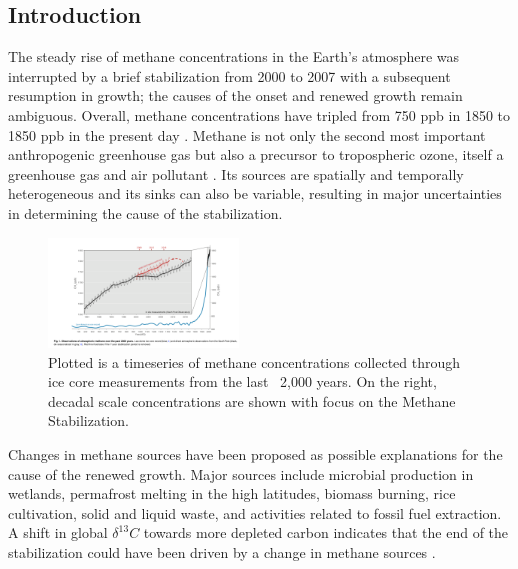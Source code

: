 \documentclass[two column,grl]{AGUTeX}
\begin{document}
\begin{article}

\section{Introduction}
The steady rise of methane concentrations in the Earth’s atmosphere was interrupted by a brief stabilization from 2000 to 2007 with  a subsequent resumption in growth; the causes of the onset and renewed growth remain ambiguous. Overall, methane concentrations have tripled  from 750 ppb in 1850 to 1850 ppb in the present day \citep{IPCC}. Methane is not only the second most important anthropogenic greenhouse gas  but also a  precursor to tropospheric ozone, itself a greenhouse gas and air pollutant \citep{fiore_impact_2006, shindell_simultaneously_2012, IPCC}. Its sources are spatially and temporally heterogeneous and its sinks can also be  variable, resulting in major uncertainties in determining the cause of the stabilization.

\begin{figure}
\begin{center}
\includegraphics[width= 0.45\textwidth]{./methane_timeseries.png}
\end{center}
\caption{Plotted is a timeseries of methane concentrations collected through ice core measurements from the last ~2,000 years. On the right, decadal scale concentrations are shown with focus on the Methane Stabilization.}
\end{figure}

Changes in methane sources have been proposed as possible explanations for the cause of the renewed growth. Major sources include microbial production in wetlands, permafrost melting in the high latitudes, biomass burning, rice cultivation, solid and liquid waste, and activities related to fossil fuel extraction. A shift in global $\delta^{13}C$ towards more depleted carbon indicates that the end of the stabilization could have been driven by a change in methane sources \citep{bousquet_contribution_2006, kai_reduced_2011}. 


\end{article}
\end{document}
